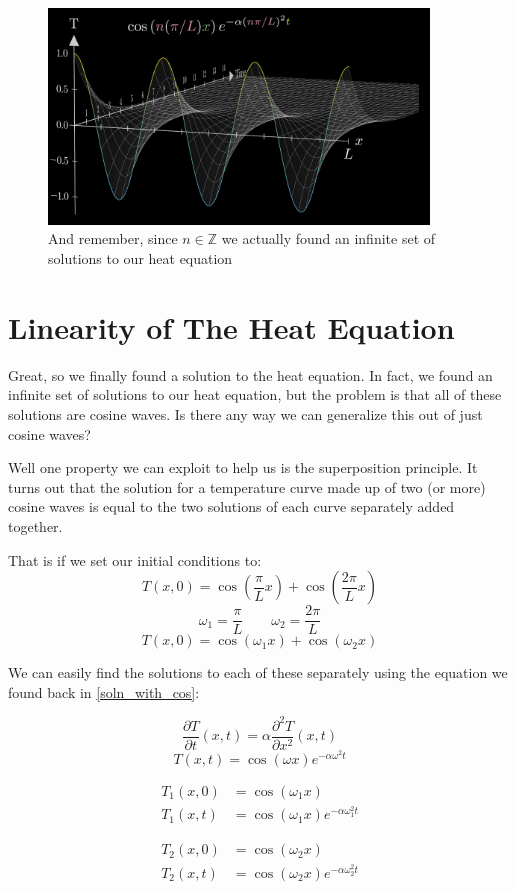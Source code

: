 \documentclass{report}
\newcommand{\heatequation}[0]{\frac{\partial T}{\partial t}(x,t) = \alpha \frac{\partial^2 T}{\partial x^2}(x,t)}
\begin{document}
\begin{figure}[H]
    \centering
    \includegraphics[width=0.9\textwidth]{images/cosx_temperature_function_2.png}
    \caption{And remember, since $n \in \mathbb{Z}$ we actually found an infinite set of solutions to our heat equation }
\end{figure}


\section{Linearity of The Heat Equation}
Great, so we finally found a solution to the heat equation. In fact, we found an infinite set of solutions to our heat equation, but the problem is that all of these solutions are cosine waves. Is there any way we can generalize this out of just cosine waves? 

Well one property we can exploit to help us is the superposition principle. It turns out that the solution for a temperature curve made up of two (or more) cosine waves is equal to the two solutions of each curve separately added together. 

That is if we set our initial conditions to:
\[ T(x,0) = \cos( \frac{\pi}{L}x ) + \cos( \frac{2\pi}{L}x )\]
\[ \omega_1 = \frac{\pi}{L} \qquad \omega_2 = \frac{2\pi}{L}\]
\[ T(x,0) = \cos( \omega_1x ) + \cos( \omega_2x )\]

We can easily find the solutions to each of these separately using 
the equation we found back in \ref{soln_with_cos}:

\[ \heatequation \]
\[ T(x,t) = \cos(\omega x)e^{-\alpha\omega^2t}  \]

\begin{minipage}{0.45\textwidth}
  \begin{align*}
      T_1(x,0) &= \cos( \omega_1x ) \\
      T_1(x,t) &= \cos(\omega_1 x)e^{-\alpha\omega_1^2t} 
    \end{align*}
\end{minipage}
\begin{minipage}{0.45\textwidth}
    \begin{align*}
        T_2(x,0) &= \cos( \omega_2x ) \\
        T_2(x,t) &= \cos(\omega_2 x)e^{-\alpha\omega_2^2t} 
    \end{align*}
\end{minipage}
\end{document}
